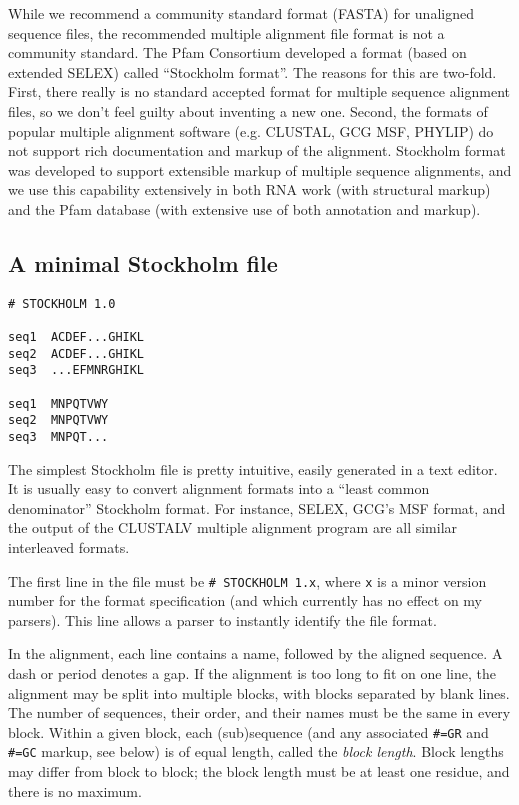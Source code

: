While we recommend a community standard format (FASTA) for unaligned
sequence files, the recommended multiple alignment file format is not
a community standard.  The Pfam Consortium developed a format (based
on extended SELEX) called ``Stockholm format''.  The reasons for this
are two-fold. First, there really is no standard accepted format for
multiple sequence alignment files, so we don't feel guilty about
inventing a new one. Second, the formats of popular multiple alignment
software (e.g. CLUSTAL, GCG MSF, PHYLIP) do not support rich
documentation and markup of the alignment.  Stockholm format was
developed to support extensible markup of multiple sequence
alignments, and we use this capability extensively in both RNA work
(with structural markup) and the Pfam database (with extensive use of
both annotation and markup).

\subsection{A minimal Stockholm file}
\begin{verbatim}
# STOCKHOLM 1.0

seq1  ACDEF...GHIKL
seq2  ACDEF...GHIKL
seq3  ...EFMNRGHIKL

seq1  MNPQTVWY
seq2  MNPQTVWY
seq3  MNPQT...

\end{verbatim}

The simplest Stockholm file is pretty intuitive, easily generated in a
text editor. It is usually easy to convert alignment formats into a
``least common denominator'' Stockholm format. For instance, SELEX,
GCG's MSF format, and the output of the CLUSTALV multiple alignment
program are all similar interleaved formats.

The first line in the file must be \verb+# STOCKHOLM 1.x+, where
\verb+x+ is a minor version number for the format specification
(and which currently has no effect on my parsers). This line allows a
parser to instantly identify the file format.

In the alignment, each line contains a name, followed by the aligned
sequence. A dash or period denotes a gap. If the alignment is too long
to fit on one line, the alignment may be split into multiple blocks,
with blocks separated by blank lines. The number of sequences, their
order, and their names must be the same in every block. Within a given
block, each (sub)sequence (and any associated \verb+#=GR+ and
\verb+#=GC+ markup, see below) is of equal length, called the
\textit{block length}. Block lengths may differ from block to block;
the block length must be at least one residue, and there is no
maximum.  

